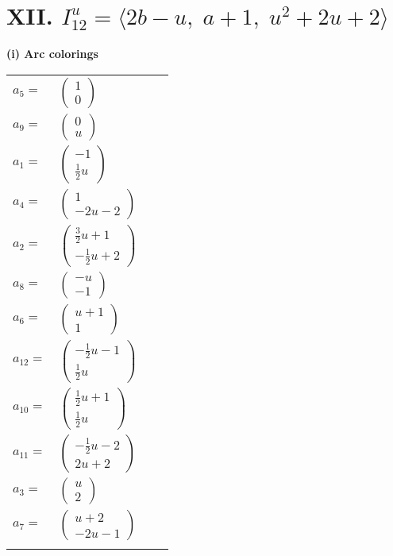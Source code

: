 \documentclass[1p]{elsarticle_modified}
\theoremstyle{definition}
\begin{document}
\centering \section*{XII. $I^u_{12}= \langle 2 b- u,\;a+1,\;u^2+2 u+2 \rangle$}
\flushleft \textbf{(i) Arc colorings}\\
\begin{tabular}{m{7pt} m{180pt} m{7pt} m{180pt} }
\flushright $a_{5}=$&$\begin{pmatrix}1\\0\end{pmatrix}$ \\
\flushright $a_{9}=$&$\begin{pmatrix}0\\u\end{pmatrix}$ \\
\flushright $a_{1}=$&$\begin{pmatrix}-1\\\frac{1}{2} u\end{pmatrix}$ \\
\flushright $a_{4}=$&$\begin{pmatrix}1\\-2 u-2\end{pmatrix}$ \\
\flushright $a_{2}=$&$\begin{pmatrix}\frac{3}{2} u+1\\-\frac{1}{2} u+2\end{pmatrix}$ \\
\flushright $a_{8}=$&$\begin{pmatrix}- u\\-1\end{pmatrix}$ \\
\flushright $a_{6}=$&$\begin{pmatrix}u+1\\1\end{pmatrix}$ \\
\flushright $a_{12}=$&$\begin{pmatrix}-\frac{1}{2} u-1\\\frac{1}{2} u\end{pmatrix}$ \\
\flushright $a_{10}=$&$\begin{pmatrix}\frac{1}{2} u+1\\\frac{1}{2} u\end{pmatrix}$ \\
\flushright $a_{11}=$&$\begin{pmatrix}-\frac{1}{2} u-2\\2 u+2\end{pmatrix}$ \\
\flushright $a_{3}=$&$\begin{pmatrix}u\\2\end{pmatrix}$ \\
\flushright $a_{7}=$&$\begin{pmatrix}u+2\\-2 u-1\end{pmatrix}$\\&\end{tabular}
\end{document}
